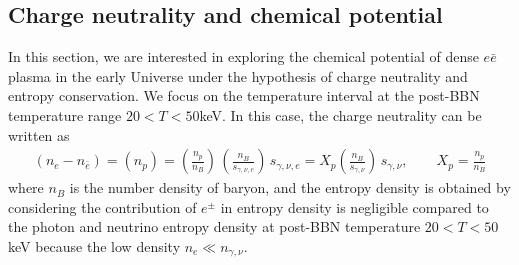 \documentclass[universe,article,submit,moreauthors,pdftex,a4paper]{Definitions/mdpi}
\begin{document}
\subsection{Charge neutrality and chemical potential}
 In this section, we are interested in exploring the chemical potential of dense $e\bar e$ plasma in the early Universe under the hypothesis of charge neutrality and entropy conservation. We focus on the temperature interval at the post-BBN temperature range $20<T<50$keV. In this case, the charge neutrality can be written as
\begin{align}
  \label{density_proton}
  \left(n_{e}-n_{\bar{e}}\right)=(n_{p})=\left(\frac{n_{p}}{n_{B}}\right)\,\left(\frac{n_{B}}{s_{\gamma,\nu,e}}\right)\,s_{\gamma,\nu,e}= X_p\left(\frac{n_B}{s_{\gamma,\nu}}\right)\,s_{\gamma,\nu},\qquad X_p=\frac{n_p}{n_B}
\end{align}
where $n_B$ is the number density of baryon, and the entropy density is obtained by considering the contribution of $e^\pm$ in entropy density is negligible compared to the photon and neutrino entropy density at post-BBN temperature $20<T<50$keV because the low density $n_e\ll n_{\gamma,\nu}$. 
\end{document}
